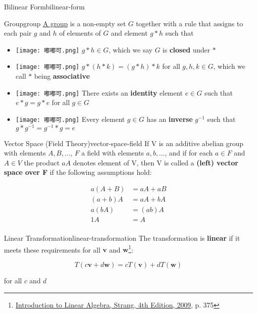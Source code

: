\begin{Definition}{Bilinear Form}{bilinear-form}
    \begin{Definition}{Group}{group}
        \href{https://www.maths.gla.ac.uk/~mwemyss/teaching/3alg1-7.pdf}{A group} is a non-empty set $G$ together with a rule that assigns to each pair $g$ and $h$ of
        elements of $G$ and element $g * h$ such that
        \begin{itemize}
            \item[] \texttt{[image: 嘟嘟可.png]}  $g * h \in G$, which we say $G$ is \textbf{closed} under $*$
            \item[] \texttt{[image: 嘟嘟可.png]} $g * (h * k) = (g * h) * k$ for all $g, h, k \in G$, which we call $*$ being
            \textbf{associative}
            \item[] \texttt{[image: 嘟嘟可.png]} There exists an \textbf{identity} element $e \in G$ such that $e * g = g * e$ for all
            $g \in G$
            \item[] \texttt{[image: 嘟嘟可.png]} Every element $g \in G$ has an \textbf{inverse} $g^{-1}$ such that
            $g * g^{-1} = g^{-1} * g = e$
        \end{itemize}
    \end{Definition}

    \begin{Definition}{Vector Space (Field Theory)}{vector-space-field}
        If V is an additive abelian group with elements $A, B, \ldots$, $F$ a field with elements $a, b, \dots$, and if for each $a \in F$ and
        $A \in V$ the product $aA$ denotes element of V, then V is called a \textbf{(left) vector space over F}
        if the following assumptions hold:

        \begin{align}
            a(A + B) &= aA + aB \\
            (a + b)A &= aA + bA \\
            a(bA) &= (ab)A \\
            1A &= A \\
        \end{align}
    \end{Definition}

    \begin{Definition}{Linear Transformation}{linear-transformation}
        The transformation is \textbf{linear} if it meets these requirements for all $\boldsymbol{v}$ and $\boldsymbol{w}$\footnote{\href{https://trello.com/c/qHJeDNkU}{Introduction to Linear Algebra, Strang, 4th Edition, 2009}, p. 375}:

        \begin{equation}
            T(c\boldsymbol{v} + d\boldsymbol{w}) = cT(\boldsymbol{v}) + dT(\boldsymbol{w})
        \end{equation}

        for all $c$ and $d$
    \end{Definition}
\end{Definition}
